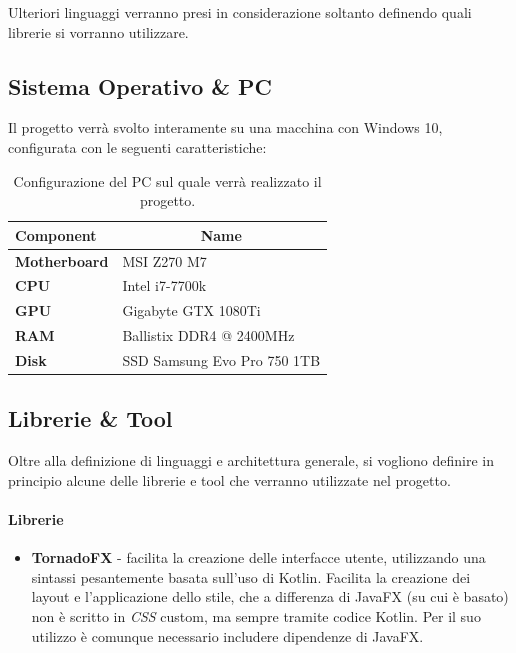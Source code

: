 \documentclass[12pt,a4paper,openright,oneside]{report}
\begin{document}
Ulteriori linguaggi verranno presi in considerazione soltanto definendo quali librerie si vorranno utilizzare.


\subsection{Sistema Operativo \& PC}
Il progetto verrà svolto interamente su una macchina con Windows 10, configurata con le seguenti caratteristiche:

\begin{table}[h]
	\centering
	\begin{tabular}{|l|l|}
		\hline
		\textbf{Component}   & \multicolumn{1}{c|}{\textbf{Name}} \\ \hline
		\textbf{Motherboard} & MSI Z270 M7                        \\ \hline
		\textbf{CPU}         & Intel i7-7700k                     \\ \hline
		\textbf{GPU}         & Gigabyte GTX 1080Ti                \\ \hline
		\textbf{RAM}         & Ballistix DDR4 @ 2400MHz           \\ \hline
		\textbf{Disk}        & SSD Samsung Evo Pro 750 1TB                \\ \hline
	\end{tabular}
	\caption{\label{tab:pc-spec} Configurazione del PC sul quale verrà realizzato il progetto.}
\end{table}

\subsection{Librerie \& Tool}
Oltre alla definizione di linguaggi e architettura generale, si vogliono definire in principio alcune delle librerie e tool che verranno utilizzate nel progetto.

\paragraph{Librerie}
\begin{itemize}
	\item \textbf{TornadoFX} \cite{tornadofx} - facilita la creazione delle interfacce utente, utilizzando una sintassi pesantemente basata sull'uso di Kotlin. Facilita la creazione dei layout e l'applicazione dello stile, che a differenza di JavaFX (su cui è basato) non è scritto in \textit{CSS} custom, ma sempre tramite codice Kotlin. Per il suo utilizzo è comunque necessario includere dipendenze di JavaFX.
\end{itemize}
	
\end{document}
